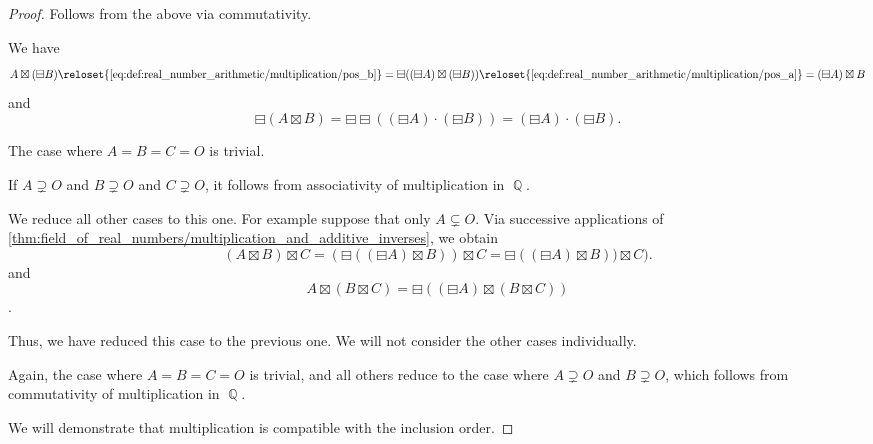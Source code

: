 \begin{proof}
   Follows from the above via commutativity.

   We have
  \begin{equation*}
    A \boxtimes (\boxminus B)
    \reloset {\eqref{eq:def:real_number_arithmetic/multiplication/pos_b}} =
    \boxminus ((\boxminus A) \boxtimes (\boxminus B))
    \reloset {\eqref{eq:def:real_number_arithmetic/multiplication/pos_a}} =
    (\boxminus A) \boxtimes B
  \end{equation*}
  and
  \begin{equation*}
    \boxminus(A \boxtimes B)
    =
    \boxminus \boxminus ((\boxminus A) \cdot (\boxminus B))
    =
    (\boxminus A) \cdot (\boxminus B).
  \end{equation*}

   The case where \( A = B = C = O \) is trivial.

  If \( A \supsetneq O \) and \( B \supsetneq O \) and \( C \supsetneq O \), it follows from associativity of multiplication in \( \BbbQ \).

  We reduce all other cases to this one. For example suppose that only \( A \subsetneq O \). Via successive applications of \cref{thm:field_of_real_numbers/multiplication_and_additive_inverses}, we obtain
  \begin{equation*}
    (A \boxtimes B) \boxtimes C
    =
    (\boxminus ((\boxminus A) \boxtimes B)) \boxtimes C
    =
    \boxminus ((\boxminus A) \boxtimes B)) \boxtimes C).
  \end{equation*}
  and
  \begin{equation*}
    A \boxtimes (B \boxtimes C)
    =
    \boxminus ((\boxminus A) \boxtimes (B \boxtimes C))
  \end{equation*}.

  Thus, we have reduced this case to the previous one. We will not consider the other cases individually.

   Again, the case where \( A = B = C = O \) is trivial, and all others reduce to the case where \( A \supsetneq O \) and \( B \supsetneq O \), which follows from commutativity of multiplication in \( \BbbQ \).

   We will demonstrate that multiplication is compatible with the inclusion order.


\end{proof}

